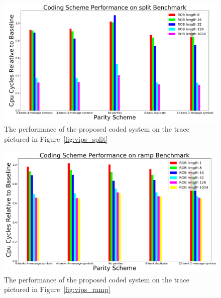 \begin{figure}[h!]
		\includegraphics[width=\linewidth]{figures/vips_split_results.png}
		\caption{The performance of the proposed coded system on the trace pictured in Figure~\ref{fig:vips_split} }
		\label{fig:vips_split_results}
\end{figure}


\begin{figure}[h!]
		\includegraphics[width=\linewidth]{figures/vips_ramp_results.png}
		\caption{The performance of the proposed coded system on the trace pictured in Figure~\ref{fig:vips_ramp}}
		\label{fig:vips_ramp_results}
\end{figure}